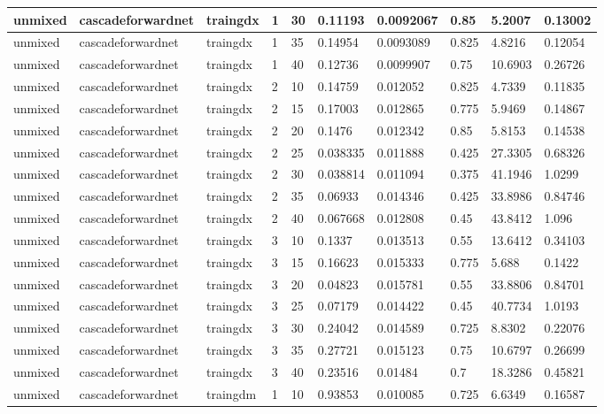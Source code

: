 \begin{longtable}{lllllllll}
unmixed & cascadeforwardnet & traingdx & 1 & 30 & 0.11193 & 0.0092067 & 0.85 & 5.2007 & 0.13002 \\ \hline 
unmixed & cascadeforwardnet & traingdx & 1 & 35 & 0.14954 & 0.0093089 & 0.825 & 4.8216 & 0.12054 \\ \hline 
unmixed & cascadeforwardnet & traingdx & 1 & 40 & 0.12736 & 0.0099907 & 0.75 & 10.6903 & 0.26726 \\ \hline 
unmixed & cascadeforwardnet & traingdx & 2 & 10 & 0.14759 & 0.012052 & 0.825 & 4.7339 & 0.11835 \\ \hline 
unmixed & cascadeforwardnet & traingdx & 2 & 15 & 0.17003 & 0.012865 & 0.775 & 5.9469 & 0.14867 \\ \hline 
unmixed & cascadeforwardnet & traingdx & 2 & 20 & 0.1476 & 0.012342 & 0.85 & 5.8153 & 0.14538 \\ \hline 
unmixed & cascadeforwardnet & traingdx & 2 & 25 & 0.038335 & 0.011888 & 0.425 & 27.3305 & 0.68326 \\ \hline 
unmixed & cascadeforwardnet & traingdx & 2 & 30 & 0.038814 & 0.011094 & 0.375 & 41.1946 & 1.0299 \\ \hline 
unmixed & cascadeforwardnet & traingdx & 2 & 35 & 0.06933 & 0.014346 & 0.425 & 33.8986 & 0.84746 \\ \hline 
unmixed & cascadeforwardnet & traingdx & 2 & 40 & 0.067668 & 0.012808 & 0.45 & 43.8412 & 1.096 \\ \hline 
unmixed & cascadeforwardnet & traingdx & 3 & 10 & 0.1337 & 0.013513 & 0.55 & 13.6412 & 0.34103 \\ \hline 
unmixed & cascadeforwardnet & traingdx & 3 & 15 & 0.16623 & 0.015333 & 0.775 & 5.688 & 0.1422 \\ \hline 
unmixed & cascadeforwardnet & traingdx & 3 & 20 & 0.04823 & 0.015781 & 0.55 & 33.8806 & 0.84701 \\ \hline 
unmixed & cascadeforwardnet & traingdx & 3 & 25 & 0.07179 & 0.014422 & 0.45 & 40.7734 & 1.0193 \\ \hline 
unmixed & cascadeforwardnet & traingdx & 3 & 30 & 0.24042 & 0.014589 & 0.725 & 8.8302 & 0.22076 \\ \hline 
unmixed & cascadeforwardnet & traingdx & 3 & 35 & 0.27721 & 0.015123 & 0.75 & 10.6797 & 0.26699 \\ \hline 
unmixed & cascadeforwardnet & traingdx & 3 & 40 & 0.23516 & 0.01484 & 0.7 & 18.3286 & 0.45821 \\ \hline 
unmixed & cascadeforwardnet & traingdm & 1 & 10 & 0.93853 & 0.010085 & 0.725 & 6.6349 & 0.16587 \\ \hline 

\end{longtable}
